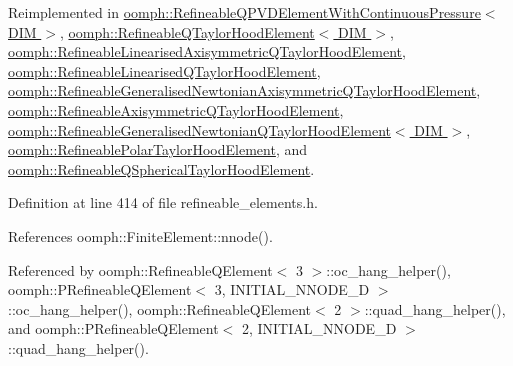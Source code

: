 Reimplemented in \hyperlink{classoomph_1_1RefineableQPVDElementWithContinuousPressure_a376ff088df9caf8cbb9a653e8837987e}{oomph\+::\+Refineable\+Q\+P\+V\+D\+Element\+With\+Continuous\+Pressure$<$ D\+I\+M $>$}, \hyperlink{classoomph_1_1RefineableQTaylorHoodElement_a0348c238d8d1bf7afb2532d6f7d1f5a8}{oomph\+::\+Refineable\+Q\+Taylor\+Hood\+Element$<$ D\+I\+M $>$}, \hyperlink{classoomph_1_1RefineableLinearisedAxisymmetricQTaylorHoodElement_ae975800ebd4a583a5dd5cf7a98438dd5}{oomph\+::\+Refineable\+Linearised\+Axisymmetric\+Q\+Taylor\+Hood\+Element}, \hyperlink{classoomph_1_1RefineableLinearisedQTaylorHoodElement_af3ac207744e86fefd03948c30f3bdb33}{oomph\+::\+Refineable\+Linearised\+Q\+Taylor\+Hood\+Element}, \hyperlink{classoomph_1_1RefineableGeneralisedNewtonianAxisymmetricQTaylorHoodElement_a7caed81d05e074469f1f024eed69494e}{oomph\+::\+Refineable\+Generalised\+Newtonian\+Axisymmetric\+Q\+Taylor\+Hood\+Element}, \hyperlink{classoomph_1_1RefineableAxisymmetricQTaylorHoodElement_a637fff45cb50b55c9c05633321489b89}{oomph\+::\+Refineable\+Axisymmetric\+Q\+Taylor\+Hood\+Element}, \hyperlink{classoomph_1_1RefineableGeneralisedNewtonianQTaylorHoodElement_a074d030db713c63e1077446d0bab5c1a}{oomph\+::\+Refineable\+Generalised\+Newtonian\+Q\+Taylor\+Hood\+Element$<$ D\+I\+M $>$}, \hyperlink{classoomph_1_1RefineablePolarTaylorHoodElement_a999bb0fb10a4ebdc446e99bddaf7cdd2}{oomph\+::\+Refineable\+Polar\+Taylor\+Hood\+Element}, and \hyperlink{classoomph_1_1RefineableQSphericalTaylorHoodElement_a91dfb940844c5bf3ba6af5ed10d683f2}{oomph\+::\+Refineable\+Q\+Spherical\+Taylor\+Hood\+Element}.



Definition at line 414 of file refineable\+\_\+elements.\+h.



References oomph\+::\+Finite\+Element\+::nnode().



Referenced by oomph\+::\+Refineable\+Q\+Element$<$ 3 $>$\+::oc\+\_\+hang\+\_\+helper(), oomph\+::\+P\+Refineable\+Q\+Element$<$ 3, I\+N\+I\+T\+I\+A\+L\+\_\+\+N\+N\+O\+D\+E\+\_\+D $>$\+::oc\+\_\+hang\+\_\+helper(), oomph\+::\+Refineable\+Q\+Element$<$ 2 $>$\+::quad\+\_\+hang\+\_\+helper(), and oomph\+::\+P\+Refineable\+Q\+Element$<$ 2, I\+N\+I\+T\+I\+A\+L\+\_\+\+N\+N\+O\+D\+E\+\_\+D $>$\+::quad\+\_\+hang\+\_\+helper().

\mbox{\label{classoomph_1_1RefineableElement_a850180084aaf164550b4f4978b42cda7}} 
